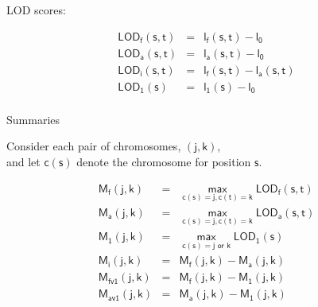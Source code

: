 \documentclass[12pt]{article}
\newcommand{\headsize}{\fontsize{35}{35} \selectfont}
\newcommand{\smallsize}{\fontsize{25}{30} \selectfont}
\newcommand{\lod}{\text{LOD}}
\newcommand{\M}{\text{M}}
\begin{document}
\hfill \begin{minipage}[t]{10in}
LOD scores:

\vspace{5mm}

\hspace{1cm}
\begin{minipage}{5in}
{\color{myblue}
\begin{eqnarray*}
\mathsf{\lod_f(s,t)}& = &\mathsf{l_f(s,t) - l_0} \\[24pt]
\mathsf{\lod_a(s,t)}& = &\mathsf{l_a(s,t) - l_0} \\[24pt]
\mathsf{\lod_i(s,t)}& = &\mathsf{l_f(s,t) - l_a(s,t)} \\[24pt]
\mathsf{\lod_1(s)}&   = &\mathsf{l_1(s) - l_0} \\[24pt]
\end{eqnarray*}
}
\end{minipage}



\end{minipage}


\newpage

\headsize \color{myyellow}
\hfill \begin{minipage}{5.75in}
\centering
Summaries
\end{minipage}

\vspace{15mm}

\color{mywhite} \smallsize

\hfill \begin{minipage}[t]{10in}
Consider each pair of chromosomes, {\color{myblue} $\mathsf{(j, k)}$}, \\
and let {\color{myblue} $\mathsf{c(s)}$} denote the chromosome for
  position {\color{myblue} $\mathsf{s}$}.

\vspace{5mm}

\hspace{1in}
\begin{minipage}{6in}
{\color{myblue}
\begin{eqnarray*}
\mathsf{\M_f(j,k)}& = &\mathsf{ \max_{c(s)=j, c(t)=k} \lod_f(s,t)} \\[12pt]
\mathsf{\M_a(j,k)}& = &\mathsf{ \max_{c(s)=j, c(t)=k} \lod_a(s,t)} \\[12pt]
\mathsf{\M_1(j,k)}& = &\mathsf{ \max_{c(s)=j \text{ or } k} \lod_1(s)} \\[36pt]
\mathsf{\M_i(j,k)}& = &\mathsf{ \M_f(j,k) - \M_a(j,k)}\\[12pt]
\mathsf{\M_{fv1}(j,k)}& = &\mathsf{ \M_f(j,k) - \M_1(j,k)}\\[12pt]
\mathsf{\M_{av1}(j,k)}& = &\mathsf{ \M_a(j,k) - \M_1(j,k)}
\end{eqnarray*}
}
\end{minipage}
\end{minipage}
\end{document}
